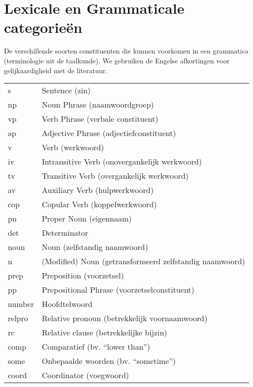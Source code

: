 \section*{Lexicale en Grammaticale categorieën}
De verschillende soorten constituenten die kunnen voorkomen in een grammatica (terminologie uit de taalkunde). We gebruiken de Engelse afkortingen voor gelijkaardigheid met de literatuur.
\begin{flushleft}
  \renewcommand{\arraystretch}{1.1}
  \begin{tabularx}{\textwidth}{@{}p{12mm}X@{}}
    s     & Sentence (zin) \\
    np    & Noun Phrase (naamwoordgroep) \\
    vp    & Verb Phrase (verbale constituent) \\
    ap    & Adjective Phrase (adjectiefconstituent) \\
    v     & Verb (werkwoord) \\
    iv    & Intransitive Verb (onovergankelijk werkwoord) \\
    tv    & Transitive Verb (overgankelijk werkwoord) \\
    av    & Auxiliary Verb (hulpwerkwoord) \\
    cop   & Copular Verb (koppelwerkwoord) \\
    pn    & Proper Noun (eigennaam) \\
    det   & Determinator \\
    noun  & Noun (zelfstandig naamwoord) \\
    n     & (Modified) Noun (getransformeerd zelfstandig naamwoord) \\
    prep  & Preposition (voorzetsel) \\
    pp    & Prepositional Phrase (voorzetselconstituent) \\
    number& Hoofdtelwoord \\
    relpro& Relative pronoun (betrekkelijk voornaamwoord) \\
    rc    & Relative clause (betrekkelijke bijzin) \\
    comp  & Comparatief (bv. ``lower than'') \\
    some  & Onbepaalde woorden (bv. ``sometime'') \\
    coord & Coordinator (voegwoord) \\
  \end{tabularx}
\end{flushleft}

